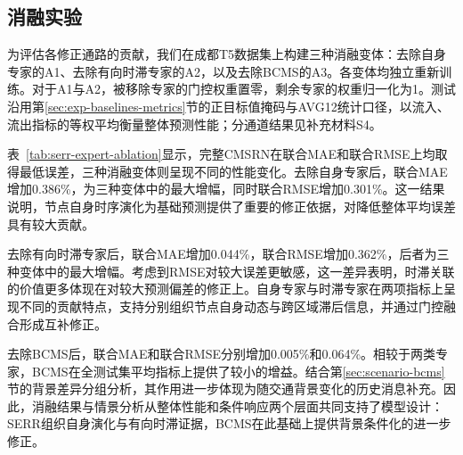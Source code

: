 \subsection{消融实验}\label{sec:exp-ablation}

为评估各修正通路的贡献，我们在成都T5数据集上构建三种消融变体：去除自身专家的A1、去除有向时滞专家的A2，以及去除BCMS的A3。各变体均独立重新训练。对于A1与A2，被移除专家的门控权重置零，剩余专家的权重归一化为1。测试沿用第\ref{sec:exp-baselines-metrics}节的正目标值掩码与AVG12统计口径，以流入、流出指标的等权平均衡量整体预测性能；分通道结果见补充材料S4。

表~\ref{tab:serr-expert-ablation}显示，完整CMSRN在联合MAE和联合RMSE上均取得最低误差，三种消融变体则呈现不同的性能变化。去除自身专家后，联合MAE增加0.386\%，为三种变体中的最大增幅，同时联合RMSE增加0.301\%。这一结果说明，节点自身时序演化为基础预测提供了重要的修正依据，对降低整体平均误差具有较大贡献。

去除有向时滞专家后，联合MAE增加0.044\%，联合RMSE增加0.362\%，后者为三种变体中的最大增幅。考虑到RMSE对较大误差更敏感，这一差异表明，时滞关联的价值更多体现在对较大预测偏差的修正上。自身专家与时滞专家在两项指标上呈现不同的贡献特点，支持分别组织节点自身动态与跨区域滞后信息，并通过门控融合形成互补修正。

去除BCMS后，联合MAE和联合RMSE分别增加0.005\%和0.064\%。相较于两类专家，BCMS在全测试集平均指标上提供了较小的增益。结合第\ref{sec:scenario-bcms}节的背景差异分组分析，其作用进一步体现为随交通背景变化的历史消息补充。因此，消融结果与情景分析从整体性能和条件响应两个层面共同支持了模型设计：SERR组织自身演化与有向时滞证据，BCMS在此基础上提供背景条件化的进一步修正。


\FloatBarrier
